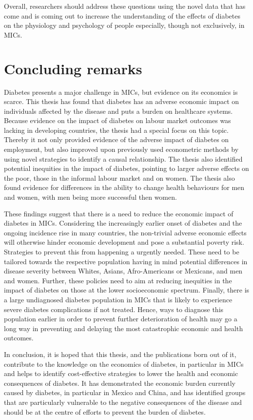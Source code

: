 Overall, researchers should address these questions using the novel data that has come and is coming out to increase the understanding of the effects of diabetes on the physiology and psychology of people especially, though not exclusively, in \acp{MIC}.


\section{Concluding remarks}

Diabetes presents a major challenge in \acp{MIC}, but evidence on its economics is scarce. This thesis has found that diabetes has an adverse economic impact on individuals affected by the disease and puts a burden on healthcare systems. Because evidence on the impact of diabetes on labour market outcomes was lacking in developing countries, the thesis had a special focus on this topic. Thereby it not only provided evidence of the adverse impact of diabetes on employment, but also improved upon previously used econometric methods by using novel strategies to identify a causal relationship. The thesis also identified potential inequities in the impact of diabetes, pointing to larger adverse effects on the poor, those in the informal labour market and on women. The thesis also found evidence for differences in the ability to change health behaviours for men and women, with men being more successful then women. 

These findings suggest that there is a need to reduce the economic impact of diabetes in \acp{MIC}. Considering the increasingly earlier onset of diabetes and the ongoing incidence rise in many countries, the non-trivial adverse economic effects will otherwise hinder economic development and pose a substantial poverty risk. Strategies to prevent this from happening a urgently needed. These need to be tailored towards the respective population having in mind potential differences in disease severity between Whites, Asians, Afro-Americans or Mexicans, and men and women. Further, these policies need to aim at reducing inequities in the impact of diabetes on those at the lower socioeconomic spectrum. Finally, there is a large undiagnosed diabetes population in \acp{MIC} that is likely to experience severe diabetes complications if not treated. Hence, ways to diagnose this population earlier in order to prevent further deterioration of health may go a long way in preventing and delaying the most catastrophic economic and health outcomes.

In conclusion, it is hoped that this thesis, and the publications born out of it, contribute to the knowledge on the economics of diabetes, in particular in \acp{MIC} and helps to identify cost-effective strategies to lower the health and economic consequences of diabetes. It has demonstrated the economic burden currently caused by diabetes, in particular in Mexico and China, and has identified groups that are particularly vulnerable to the negative consequences of the disease and should be at the centre of efforts to prevent the burden of diabetes. 







